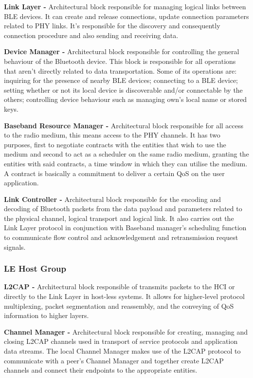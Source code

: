 \textbf{Link Layer -} Architectural block responsible for managing logical links between \ac{BLE} devices. It can create and release connections, update connection parameters related to \ac{PHY} links. It's responsible for the discovery and consequently connection procedure and also sending and receiving data.


\textbf{Device Manager -} Architectural block responsible for controlling the general behaviour of the Bluetooth device. This block is responsible for all operations that aren't directly related to data transportation. Some of its operations are: inquiring for the presence of nearby  \ac{BLE} devices; connecting to a \ac{BLE} device; setting whether or not its local device is discoverable and/or connectable by the others; controlling device behaviour such as managing own's local name or stored keys. 


\textbf{Baseband Resource Manager -} Architectural block responsible for all access to the radio medium, this means access to the \ac{PHY} channels. It has two purposes, first to negotiate contracts with the entities that wish to use the medium and second to act as a scheduler on the same radio medium, granting the entities with said contracts, a time window in which they can utilise the medium. A contract is basically a commitment to deliver a certain \ac{QoS} on the user application.


\textbf{Link Controller -} Architectural block responsible for the encoding and decoding of Bluetooth packets from the data payload and parameters related to the physical channel, logical transport and logical link. It also carries out the Link Layer protocol in conjunction with Baseband manager's scheduling function to communicate flow control and acknowledgement and retransmission request signals.



\subsubsection{ \ac{LE} Host Group}
\label{subsec:LEHost}

\textbf{\ac{L2CAP} -} Architectural block responsible of transmits packets to the \ac{HCI} or directly to the Link Layer in host-less systems. It allows for higher-level protocol multiplexing, packet segmentation and reassembly, and the conveying of \ac{QoS} information to higher layers.

 
\textbf{Channel Manager -} Architectural block responsible for creating, managing and closing \ac{L2CAP} channels used in transport of service protocols and application data streams. The local Channel Manager makes use of the \ac{L2CAP} protocol to communicate with a peer's Channel Manager and together create \ac{L2CAP} channels and connect their endpoints to the appropriate entities.


